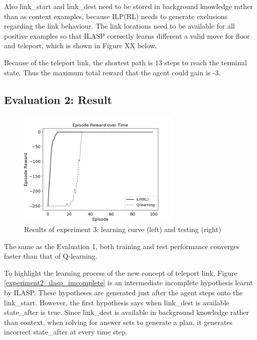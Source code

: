 Also link\_start and link\_dest need to be stored in background knowledge rather than as context examples,
because ILP(RL) needs to generate exclusions regarding the link behaviour.
The link locations need to be available for all positive examples so that ILASP correctly learns different a valid move for floor and teleport, which is shown in Figure XX below.

Because of the teleport link, the shortest path is 13 steps to reach the terminal state. Thus the maximum total reward that the agent could gain is -3.

\subsection{Evaluation 2: Result}
\label{subsec:experiment2_result}
    
\begin{figure}[!htb]
\centering
\includegraphics[width=0.7\textwidth]{./figures/experiment2_test}
\caption{Results of experiment 3: learning curve (left) and testing (right)}
\label{experiment2_training}
\end{figure}

The same as the Evaluation 1, both training and test performance converges faster than that of Q-learning.



To highlight the learning process of the new concept of teleport link, Figure \ref{experiment2_ilasp_imcomplete} is an intermediate incomplete hypothesis learnt by ILASP.
These hypotheses are generated just after the agent steps onto the \textsf{link\_start}. However, the first hypothesis says
when link\_dest is available state\_after is true. Since link\_dest is available in background knowledge rather than context,
when solving for answer sets to generate a plan, it generates incorrect state\_after at every time step.

